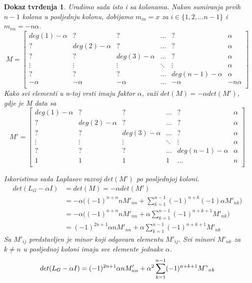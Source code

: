 \documentclass[11pt]{article}
\newtheorem*{custom_proof}{Dokaz tvrđenja}
\begin{document}
\begin{custom_proof}
		Uradimo sada isto i sa kolonama. Nakon sumiranja prvih $n-1$ kolona u posljednju kolonu, dobijamo $m_{in} = x$ za $i \in \{1,2, \dots n-1\}$ i $m_{nn} = -n \alpha$.
		\[
			M =\begin{bmatrix}
				deg(1) - \alpha & ? & ? & \dots & ? & \alpha \\
				? & deg(2) - \alpha & ? & \dots & ? & \alpha \\
				? & ? & deg(3) - \alpha & \dots & ? & \alpha \\
				\vdots & \vdots & \vdots & \ddots & \vdots & \alpha \\
				? & ? & ? & \dots &deg(n-1) - \alpha & \alpha \\
				-\alpha & -\alpha & -\alpha & \dots &-\alpha & -n \alpha \\
		\end{bmatrix}
		\]
		Kako svi elementi u n-toj vrsti imaju faktor $\alpha$, važi $det(M)=-\alpha det(M')$, gdje je M data sa
		\[
			M' =\begin{bmatrix}
				deg(1) - \alpha & ? & ? & \dots & ? & \alpha \\
				? & deg(2) - \alpha & ? & \dots & ? & \alpha \\
				? & ? & deg(3) - \alpha & \dots & ? & \alpha \\
				\vdots & \vdots & \vdots & \ddots & \vdots & \alpha \\
				? & ? & ? & \dots &deg(n-1) - \alpha & \alpha \\
				1 & 1 & 1 & 1 & \dots & n \\
				\end{bmatrix}
		\]

		Iskoristimo sada Laplasov razvoj $det(M')$ po posljednjoj koloni.
		\[ 
		\begin{split}
			det(L_G - \alpha I) & = det(M) = -\alpha det(M') \\
			                    & = -\alpha \big( (-1)^{n+n}nM'_{nn} + \sum_{k=1}^{n-1}(-1)^{n+k}(-1) \alpha M'_{nk} \big)  \\
			                    & = -\alpha \big( (-1)^{n+n}nM'_{nn} + \alpha \sum_{k=1}^{n-1}(-1)^{n+k+1}M'_{nk} \big) \\
					     	    & = (-1)^{2n+1} \alpha nM'_{nn} + \alpha \sum_{k=1}^{n-1}(-1)^{n+k+1}M'_{nk}
		\end{split}
		\]
		Sa $M'_{ij}$ predstavljen je minor koji odgovara elementu $M'_{ij}$. Svi minori $M'_{nk}$ za $k \neq n$ u posljednoj koloni imaju sve elemente jednake $\alpha$.
		\[ 
			det(L_G - \alpha I) = (-1)^{2n+1} \alpha nM'_{nn} + \alpha^2 \sum_{k=1}^{n-1}(-1)^{n+k+1}M"_{nk}
		\]
		

\end{custom_proof}
\end{document}
